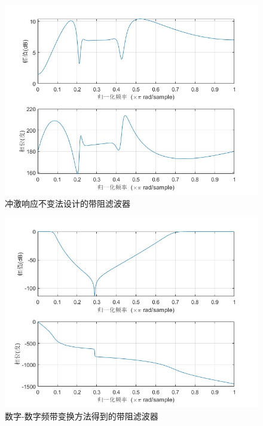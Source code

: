 \documentclass{seuer}
\begin{document}
\begin{figure}[H] %
	\centering %
	\includegraphics[width=1\textwidth]{"../DSPAssignment/带阻混叠.jpg"} %
	\caption{冲激响应不变法设计的带阻滤波器} %
	\label{Fig7} %
\end{figure}
\begin{figure}[H] %
	\centering %
	\includegraphics[width=1\textwidth]{"../DSPAssignment/带阻数字频带.jpg"} %
	\caption{数字-数字频带变换方法得到的带阻滤波器} %
	\label{Fig8} %
\end{figure}
\end{document}
